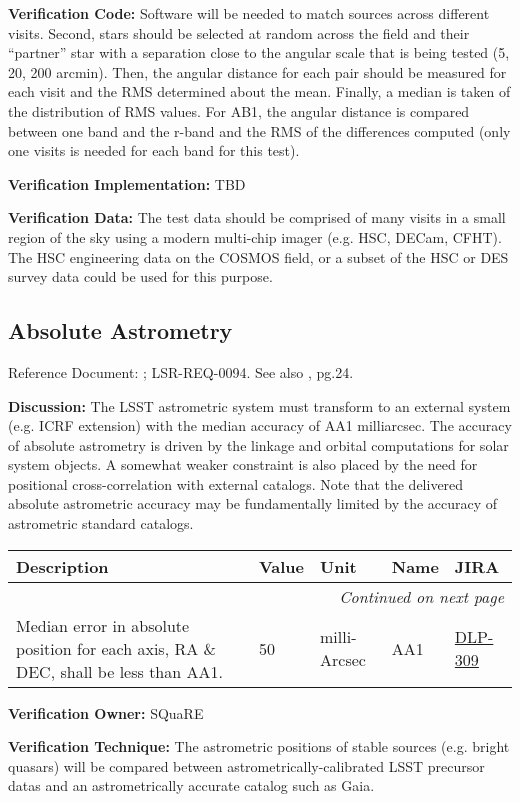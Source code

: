 \documentclass[DM,lsstdraft,toc]{lsstdoc}
\makeatletter
\newcommand{\jira}[1]{\href{https://jira.lsstcorp.org/browse/#1}{#1}}
\newenvironment{metric}[0]{%
\setlength\LTleft{0pt}
\setlength\LTright{\fill}
\begin{longtable}[]{@{}p{0.4\textwidth}lp{0.75in}p{1.3in}p{0.75in}@{}}

\hline \textbf{Description} & \textbf{Value} & \textbf{Unit} & \textbf{Name} & \textbf{JIRA} \\ \hline
\endhead

\hline \multicolumn{5}{r}{\emph{Continued on next page}} \\
\endfoot

\hline\hline
\endlastfoot
}{%
\hline
\end{longtable}
}
\makeatother
\begin{document}
\textbf{Verification Code:} Software will be needed to match sources
across different visits. Second, stars should be selected at random
across the field and their ``partner'' star with a separation close to
the angular scale that is being tested (5, 20, 200 arcmin). Then, the
angular distance for each pair should be measured for each visit and the
RMS determined about the mean. Finally, a median is taken of the
distribution of RMS values. For AB1, the angular distance is compared
between one band and the r-band and the RMS of the differences computed
(only one visits is needed for each band for this test).

\textbf{Verification Implementation:} TBD

\textbf{Verification Data:} The test data should be comprised of many
visits in a small region of the sky using a modern multi-chip imager
(e.g. HSC, DECam, CFHT). The HSC engineering data on the COSMOS field,
or a subset of the HSC or DES survey data could be used for this
purpose.

\subsection{Absolute Astrometry}\label{absolute-astrometry}

Reference Document: ; LSR-REQ-0094. See also \SRD, pg.24.

\textbf{Discussion:} The LSST astrometric system must transform to an
external system (e.g. ICRF extension) with the median accuracy of AA1
milliarcsec. The accuracy of absolute astrometry is driven by the
linkage and orbital computations for solar system objects. A somewhat
weaker constraint is also placed by the need for positional
cross-correlation with external catalogs. Note that the delivered
absolute astrometric accuracy may be fundamentally limited by the
accuracy of astrometric standard catalogs.

\begin{metric}
Median error in absolute position for each axis, RA \& DEC, shall be
less than AA1. & 50 & milli-Arcsec & AA1 & \jira{DLP-309}\tabularnewline
\end{metric}

\textbf{Verification Owner:} SQuaRE

\textbf{Verification Technique:} The astrometric positions of stable
sources (e.g. bright quasars) will be compared between
astrometrically-calibrated LSST precursor datas and an astrometrically
accurate catalog such as Gaia.
\end{document}
